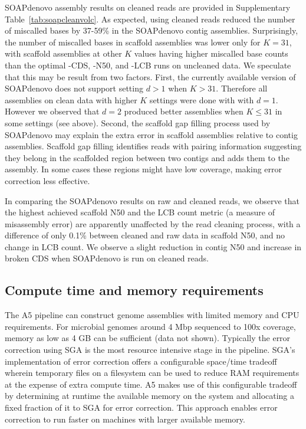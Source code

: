 \documentclass[10pt]{article}
\begin{document}
SOAPdenovo assembly results on cleaned reads are provided in Supplementary Table~\ref{tab:soapcleanvolc}. 
As expected, using cleaned reads reduced the number of miscalled bases by 37-59\% in the SOAPdenovo contig assemblies.
Surprisingly, the number of miscalled bases in scaffold assemblies was lower only for $K=31$, with scaffold assemblies at other $K$ values having higher miscalled base counts than the optimal -CDS, -N50, and -LCB runs on uncleaned data.
We speculate that this may be result from two factors. First, the currently available version of SOAPdenovo does not support setting $d>1$ when $K>31$. Therefore all assemblies on clean data with higher $K$ settings were done with with $d=1$. However we observed that $d=2$ produced better assemblies when $K \le 31$ in some settings (see above). Second, the scaffold gap filling process used by SOAPdenovo may explain the extra error in scaffold assemblies relative to contig assemblies. Scaffold gap filling identifies reads with pairing information suggesting they belong in the scaffolded region between two contigs and adds them to the assembly. In some cases these regions might have low coverage, making error correction less effective.

In comparing the SOAPdenovo results on raw and cleaned reads, we observe that the highest achieved scaffold N50 and the LCB count metric (a measure of misassembly error) are apparently unaffected by the read cleaning process, with a difference of only 0.1\% between cleaned and raw data in scaffold N50, and no change in LCB count.  We observe a slight reduction in contig N50 and increase in broken CDS when SOAPdenovo is run on cleaned reads.

\subsection*{Compute time and memory requirements}

The A5 pipeline can construct genome assemblies with limited memory and CPU requirements. 
For microbial genomes around 4 Mbp sequenced to 100x coverage, memory as low as 4 GB can be sufficient (data not shown). 
Typically the error correction using SGA is the most resource intensive stage in the pipeline. 
SGA's implementation of error correction offers a configurable space/time tradeoff wherein temporary files on a filesystem can be used to reduce RAM requirements at the expense of extra compute time. 
A5 makes use of this configurable tradeoff by determining at runtime the available memory on the system and allocating a fixed fraction of it to SGA for error correction.
This approach enables error correction to run faster on machines with larger available memory.
\end{document}
